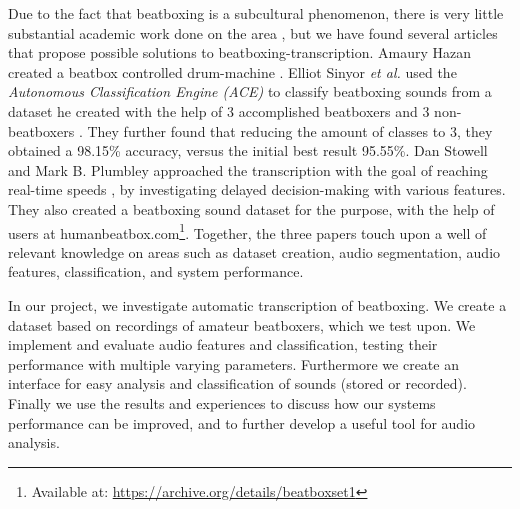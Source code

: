 Due to the fact that beatboxing is a subcultural phenomenon, there is very little substantial academic work done on the area \citep{Stowell2008}, but we have found several articles that propose possible solutions to beatboxing-transcription. Amaury Hazan created a beatbox controlled drum-machine \citep{Hazan2005}. Elliot Sinyor \textit{et al.} used the \textit{Autonomous Classification Engine (ACE)} to classify beatboxing sounds from a dataset he created with the help of 3 accomplished beatboxers and 3 non-beatboxers \citep{Sinyor05}. They further found that reducing the amount of classes to 3, they obtained a 98.15\% accuracy, versus the initial best result 95.55\%. Dan Stowell and Mark B. Plumbley approached the transcription with the goal of reaching real-time speeds \citep{Stowell2008}, by investigating delayed decision-making with various features. They also created a beatboxing sound dataset for the purpose, with the help of users at humanbeatbox.com\footnote{Available at: \url{https://archive.org/details/beatboxset1}}. Together, the three papers touch upon a well of relevant knowledge on areas such as dataset creation, audio segmentation, audio features,  classification, and system performance.


In our project, we investigate automatic transcription of beatboxing. We create a dataset based on recordings of amateur beatboxers, which we test upon. We implement and evaluate audio features and classification, testing their performance with multiple varying parameters.
Furthermore we create an interface for easy analysis and classification of sounds (stored or recorded). Finally we use the results and experiences to discuss how our systems performance can be improved, and to further develop a useful tool for audio analysis.


